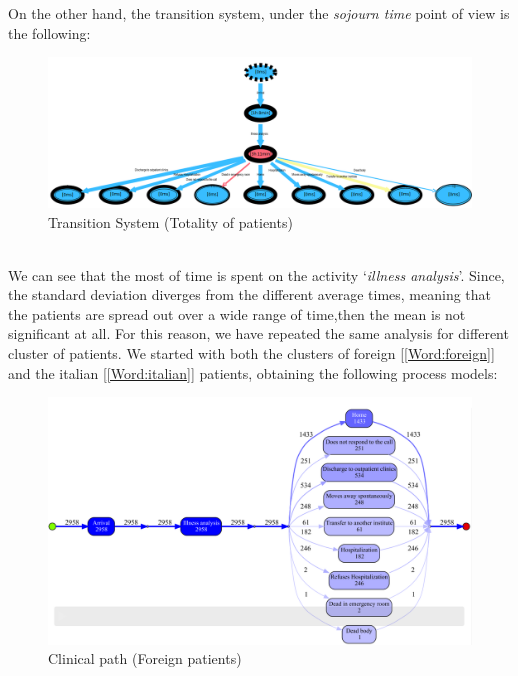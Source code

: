 \clearpage
\noindent
On the other hand, the transition system, under the \textit{sojourn time} point of view is the following:
\begin{figure} [htbp]
\includegraphics[width=\textwidth, keepaspectratio]{ProntoSoccorsoTransitionSystemSojourn}
\caption{Transition System (Totality of patients)}
\end{figure}\\
We can see that the most of time is spent on the activity `\textit{illness analysis}'. Since, the standard deviation diverges from the different average times, meaning that the patients are spread out over a wide range of time,then the mean is not significant at all. For this reason, we have repeated the same analysis for different cluster of patients. We started with both the clusters of foreign [\ref{Word:foreign}] and the italian [\ref{Word:italian}] patients, obtaining the following process models:
\begin{figure} [htbp]
\includegraphics[width=\textwidth , keepaspectratio]{ProntoSoccorsoInductiveVisualMinerForeigns}
\caption{Clinical path (Foreign patients)}
\end{figure}
\clearpage
\noindent
